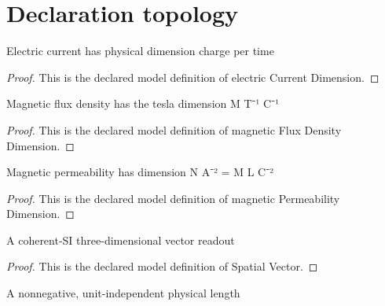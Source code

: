 \section{Declaration topology}
\begin{definition}
  \label{def:physics:phyx-mini-0962:phyxminiproblems-problemphyxmini0962-electriccurrentdimension}
  Electric current has physical dimension charge per time
\end{definition}
\begin{proof}
  This is the declared model definition of electric Current Dimension.
\end{proof}
\begin{definition}
  \label{def:physics:phyx-mini-0962:phyxminiproblems-problemphyxmini0962-magneticfluxdensitydimension}
  Magnetic flux density has the tesla dimension M T⁻¹ C⁻¹
\end{definition}
\begin{proof}
  This is the declared model definition of magnetic Flux Density Dimension.
\end{proof}
\begin{definition}
  \label{def:physics:phyx-mini-0962:phyxminiproblems-problemphyxmini0962-magneticpermeabilitydimension}
  Magnetic permeability has dimension N A⁻² = M L C⁻²
\end{definition}
\begin{proof}
  This is the declared model definition of magnetic Permeability Dimension.
\end{proof}
\begin{definition}
  \label{def:physics:phyx-mini-0962:phyxminiproblems-problemphyxmini0962-spatialvector}
  A coherent-SI three-dimensional vector readout
\end{definition}
\begin{proof}
  This is the declared model definition of Spatial Vector.
\end{proof}
\begin{definition}
  \label{def:physics:phyx-mini-0962:phyxminiproblems-problemphyxmini0962-lengthmagnitude}
  A nonnegative, unit-independent physical length
\end{definition}
